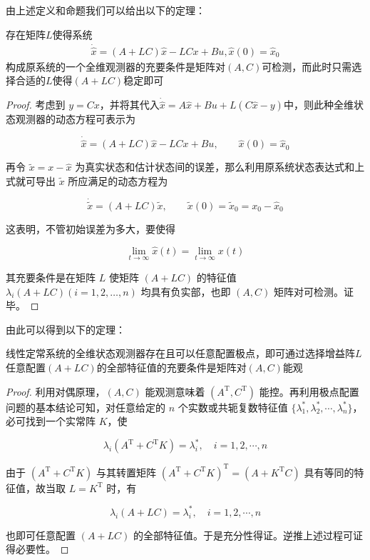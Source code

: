 由上述定义和命题我们可以给出以下的定理：
\begin{theorem}
    存在矩阵$L$使得系统
    \begin{align*}
        \dot{\hat{x}} = (A + LC) \hat{x} - LC x + Bu , \hat{x}(0) = \hat{x}_0
    \end{align*}
    构成原系统的一个全维观测器的充要条件是矩阵对$(A,C)$可检测，而此时只需选择合适的$L$使得$(A+LC)$稳定即可
    \begin{proof}
        考虑到 $y=Cx$，并将其代入$\dot{\hat{x}} = A \hat{x} + Bu + L(C \hat{x} - y)$中，则此种全维状态观测器的动态方程可表示为

        \[
        \dot{\hat{x}}=(A+LC)\hat{x}-LCx+Bu,\qquad \hat{x}(0)=\hat{x}_0
        \]

        再令 $\tilde{x}=x-\hat{x}$ 为真实状态和估计状态间的误差，那么利用原系统状态表达式和上式就可导出 $\tilde{x}$ 所应满足的动态方程为

        \[
        \dot{\tilde{x}}=(A+LC)\tilde{x},\qquad \tilde{x}(0)=\tilde{x}_0=x_0-\hat{x}_0
        \]

        这表明，不管初始误差为多大，要使得

        \[
        \lim_{t\to\infty}\hat{x}(t)=\lim_{t\to\infty}x(t)
        \]

        其充要条件是在矩阵 $L$ 使矩阵 $(A+LC)$ 的特征值 $\lambda_i(A+LC)(i=1,2,\ldots,n)$ 均具有负实部，也即 $(A,C)$ 矩阵对可检测。证毕。
    \end{proof}
\end{theorem}

由此可以得到以下的定理：
\begin{theorem}
    线性定常系统的全维状态观测器存在且可以任意配置极点，即可通过选择增益阵$L$任意配置$(A+LC)$的全部特征值的充要条件是矩阵对$(A,C)$能观
    \begin{proof}
        利用对偶原理，$(A,C)$ 能观测意味着 $(A^{\mathrm{T}},C^{\mathrm{T}})$ 能控。再利用极点配置问题的基本结论可知，对任意给定的 $n$ 个实数或共轭复数特征值 $\{\lambda_1^*,\lambda_2^*,\cdots,\lambda_n^*\}$，必可找到一个实常阵 $K$，使

        \[
        \lambda_i(A^{\mathrm{T}}+C^{\mathrm{T}}K)=\lambda_i^*,\quad i=1,2,\cdots,n
        \]

        由于 $(A^{\mathrm{T}}+C^{\mathrm{T}}K)$ 与其转置矩阵 $(A^{\mathrm{T}}+C^{\mathrm{T}}K)^{\mathrm{T}}=(A+K^{\mathrm{T}}C)$ 具有等同的特征值，故当取 $L=K^{\mathrm{T}}$ 时，有

        \[
        \lambda_i(A+LC)=\lambda_i^*,\quad i=1,2,\cdots,n
        \]

        也即可任意配置 $(A+LC)$ 的全部特征值。于是充分性得证。逆推上述过程可证得必要性。
    \end{proof}
\end{theorem}

